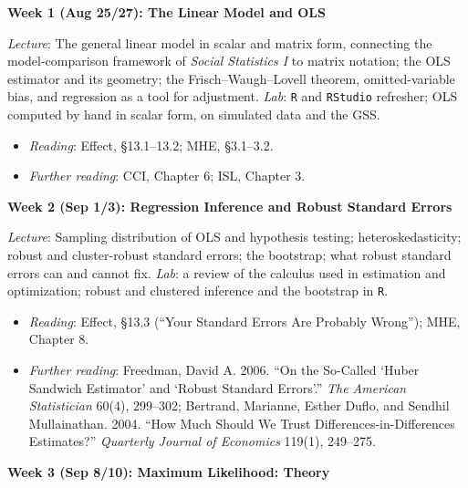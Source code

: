 \documentclass[12pt]{article}
\begin{document}

\noindent \textbf{\textcolor{titlecolor}{Week 1 (Aug 25/27): The Linear Model and OLS}}

\noindent \textit{Lecture}: The general linear model in scalar and matrix form, connecting the model-comparison framework of \textit{Social Statistics I} to matrix notation; the OLS estimator and its geometry; the Frisch--Waugh--Lovell theorem, omitted-variable bias, and regression as a tool for adjustment. \textit{Lab}: \texttt{R} and \texttt{RStudio} refresher; OLS computed by hand in scalar form, on simulated data and the GSS.
\begin{itemize}[noitemsep, topsep=2pt]
    \item \textit{Reading}: Effect, \S 13.1--13.2; MHE, \S 3.1--3.2.
    \item \textit{Further reading}: CCI, Chapter 6; ISL, Chapter 3.
\end{itemize}

\vspace{0.8em} \noindent \textbf{\textcolor{titlecolor}{Week 2 (Sep 1/3): Regression Inference and Robust Standard Errors}}

\noindent \textit{Lecture}: Sampling distribution of OLS and hypothesis testing; heteroskedasticity; robust and cluster-robust standard errors; the bootstrap; what robust standard errors can and cannot fix. \textit{Lab}: a review of the calculus used in estimation and optimization; robust and clustered inference and the bootstrap in \texttt{R}.
\begin{itemize}[noitemsep, topsep=2pt]
    \item \textit{Reading}: Effect, \S 13.3 (``Your Standard Errors Are Probably Wrong''); MHE, Chapter 8.
    \item \textit{Further reading}: Freedman, David A. 2006. ``On the So-Called `Huber Sandwich Estimator' and `Robust Standard Errors'.'' \textit{The American Statistician} 60(4), 299--302; Bertrand, Marianne, Esther Duflo, and Sendhil Mullainathan. 2004. ``How Much Should We Trust Differences-in-Differences Estimates?'' \textit{Quarterly Journal of Economics} 119(1), 249--275.
\end{itemize}

\vspace{0.8em} \noindent \textbf{\textcolor{titlecolor}{Week 3 (Sep 8/10): Maximum Likelihood: Theory}}
\end{document}
